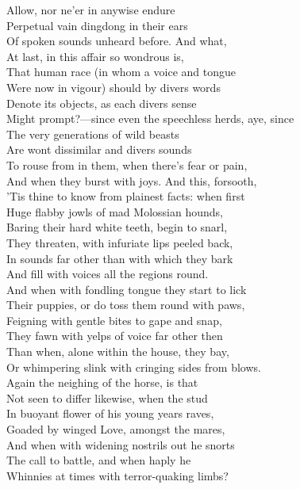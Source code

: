 Allow, nor ne'er in anywise endure\\
Perpetual vain dingdong in their ears\\
Of spoken sounds unheard before. And what,\\
At last, in this affair so wondrous is,\\
That human race (in whom a voice and tongue\\
Were now in vigour) should by divers words\\
Denote its objects, as each divers sense\\
Might prompt?—since even the speechless herds, aye, since\\
The very generations of wild beasts\\
Are wont dissimilar and divers sounds\\
To rouse from in them, when there's fear or pain,\\
And when they burst with joys. And this, forsooth,\\
'Tis thine to know from plainest facts: when first\\
Huge flabby jowls of mad Molossian hounds,\\
Baring their hard white teeth, begin to snarl,\\
They threaten, with infuriate lips peeled back,\\
In sounds far other than with which they bark\\
And fill with voices all the regions round.\\
And when with fondling tongue they start to lick\\
Their puppies, or do toss them round with paws,\\
Feigning with gentle bites to gape and snap,\\
They fawn with yelps of voice far other then\\
Than when, alone within the house, they bay,\\
Or whimpering slink with cringing sides from blows.\\
Again the neighing of the horse, is that\\
Not seen to differ likewise, when the stud\\
In buoyant flower of his young years raves,\\
Goaded by winged Love, amongst the mares,\\
And when with widening nostrils out he snorts\\
The call to battle, and when haply he\\
Whinnies at times with terror-quaking limbs?\\
